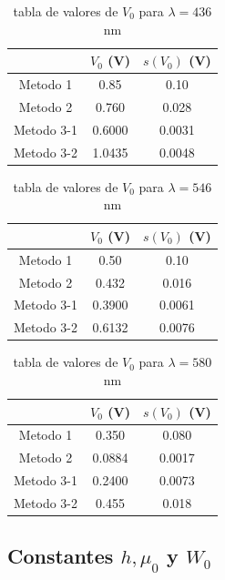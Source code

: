 \documentclass[12pt,a4paper]{article}
\numberwithin{equation}{section}
\numberwithin{table}{section}
\numberwithin{figure}{section}
\begin{document}
 
\begin{table}[h!] \centering 
\begin{tabular}{c|c|c} 
 & $V_0$ (V) & $s(V_0)$ (V) \\ \hline 
Metodo 1 & 0.85 &  0.10 \\ 
Metodo 2 & 0.760 &  0.028 \\ 
Metodo 3-1 & 0.6000 &  0.0031 \\ 
Metodo 3-2 & 1.0435 &  0.0048 \\ \hline
\end{tabular}
\caption{tabla de valores de $V_0$ para $\lambda=436$ nm} 
\label{Tab:7.2.3} 
\end{table} 


\begin{table}[h!] \centering 
\begin{tabular}{c|c|c} 
 & $V_0$ (V) & $s(V_0)$ (V) \\ \hline 
Metodo 1 & 0.50 &  0.10 \\ 
Metodo 2 & 0.432 &  0.016 \\ 
Metodo 3-1 & 0.3900 &  0.0061 \\ 
Metodo 3-2 & 0.6132 &  0.0076 \\ \hline
\end{tabular}
\caption{tabla de valores de $V_0$ para $\lambda=546$ nm} 
\label{Tab:7.2.4} 
\end{table} 

\newpage

 
\begin{table}[h!] \centering 
\begin{tabular}{c|c|c} 
 & $V_0$ (V) & $s(V_0)$ (V) \\ \hline 
Metodo 1 & 0.350 &  0.080 \\ 
Metodo 2 & 0.0884 &  0.0017 \\ 
Metodo 3-1 & 0.2400 &  0.0073 \\ 
Metodo 3-2 & 0.455 &  0.018 \\ \hline
\end{tabular}
\caption{tabla de valores de $V_0$ para $\lambda=580$ nm \\}  
\label{Tab:7.2.5} 
\end{table}  



\subsection{Constantes $h, \mu_0$ y $W_0$} \label{Subsec:7.2}
\end{document}
